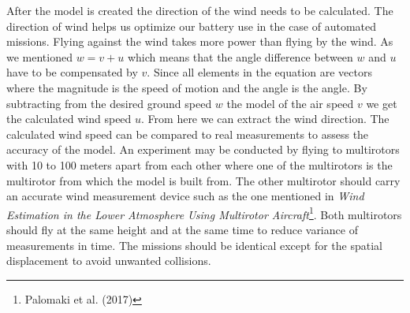 \documentclass[12pt,oneside]{reedthesis}
\theoremstyle{definition}
\theoremstyle{definition}
\theoremstyle{definition}
\theoremstyle{remark}
\begin{document}
After the model is created the direction of the wind needs to be
calculated. The direction of wind helps us optimize our battery use in
the case of automated missions. Flying against the wind takes more power
than flying by the wind. As we mentioned \(w = v + u\) which means that
the angle difference between \(w\) and \(u\) have to be compensated by
\(v\). Since all elements in the equation are vectors where the
magnitude is the speed of motion and the angle is the angle. By
subtracting from the desired ground speed \(w\) the model of the air
speed \(v\) we get the calculated wind speed \(u\). From here we can
extract the wind direction. The calculated wind speed can be compared to
real measurements to assess the accuracy of the model. An experiment may
be conducted by flying to multirotors with 10 to 100 meters apart from
each other where one of the multirotors is the multirotor from which the
model is built from. The other multirotor should carry an accurate wind
measurement device such as the one mentioned in \emph{Wind Estimation in
the Lower Atmosphere Using Multirotor Aircraft}\footnote{Palomaki et al.
  (2017)}. Both multirotors should fly at the same height and at the
same time to reduce variance of measurements in time. The missions
should be identical except for the spatial displacement to avoid
unwanted collisions.
\end{document}
